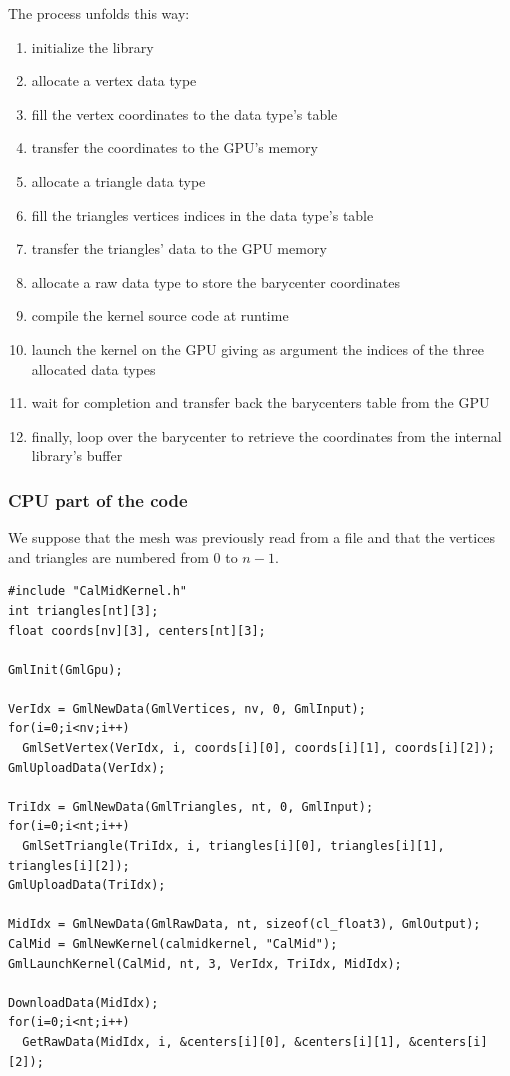 \documentclass[a4paper,12pt]{article}
\begin{document}
The process unfolds this way:
\begin{enumerate}
\item initialize the library
\item allocate a vertex data type
\item fill the vertex coordinates to the data type's table
\item transfer the coordinates to the GPU's memory
\item allocate a triangle data type
\item fill the triangles vertices indices in the data type's table
\item transfer the triangles' data to the GPU memory
\item allocate a raw data type to store the barycenter coordinates
\item compile the kernel source code at runtime
\item launch the kernel on the GPU giving as argument the indices of the three allocated data types
\item wait for completion and transfer back the barycenters table from the GPU
\item finally, loop over the barycenter to retrieve the coordinates from the internal library's buffer
\end{enumerate}

\subsubsection{CPU part of the code}
We suppose that the mesh was previously read from a file and that the vertices and triangles are numbered from 0 to $n-1$.

\begin{tt}
\begin{verbatim}
#include "CalMidKernel.h"
int triangles[nt][3];
float coords[nv][3], centers[nt][3];

GmlInit(GmlGpu);

VerIdx = GmlNewData(GmlVertices, nv, 0, GmlInput);
for(i=0;i<nv;i++)
  GmlSetVertex(VerIdx, i, coords[i][0], coords[i][1], coords[i][2]);
GmlUploadData(VerIdx);

TriIdx = GmlNewData(GmlTriangles, nt, 0, GmlInput);
for(i=0;i<nt;i++)
  GmlSetTriangle(TriIdx, i, triangles[i][0], triangles[i][1], triangles[i][2]);
GmlUploadData(TriIdx);

MidIdx = GmlNewData(GmlRawData, nt, sizeof(cl_float3), GmlOutput);
CalMid = GmlNewKernel(calmidkernel, "CalMid");
GmlLaunchKernel(CalMid, nt, 3, VerIdx, TriIdx, MidIdx);

DownloadData(MidIdx);
for(i=0;i<nt;i++)
  GetRawData(MidIdx, i, &centers[i][0], &centers[i][1], &centers[i][2]);
\end{verbatim}
\end{tt}
\normalfont
\end{document}
